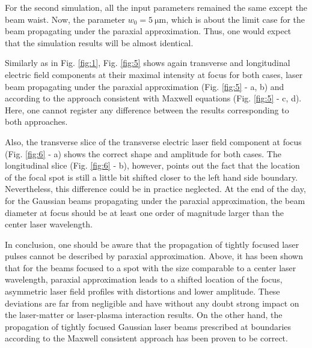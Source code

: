 For the second simulation, all the input parameters remained the same except the beam waist. Now, the parameter $ w_0 = 5 \: \mathrm{\mu m} $, which is about the limit case for the beam propagating under the paraxial approximation. Thus, one would expect that the simulation results will be almost identical.

Similarly as in Fig. \ref{fig:1}, Fig. \ref{fig:5} shows again transverse and longitudinal electric field components at their maximal intensity at focus for both cases, laser beam propagating under the paraxial approximation (Fig. \ref{fig:5} - a, b) and according to the approach consistent with Maxwell equations (Fig. \ref{fig:5} - c, d). Here, one cannot register any difference between the results corresponding to both approaches.

Also, the transverse slice of the transverse electric laser field component at focus (Fig. \ref{fig:6} - a) shows the correct shape and amplitude for both cases. The longitudinal slice (Fig. \ref{fig:6} - b), however, points out the fact that the location of the focal spot is still a little bit shifted closer to the left hand side boundary. Nevertheless, this difference could be in practice neglected. At the end of the day, for the Gaussian beams propagating under the paraxial approximation, the beam diameter at focus should be at least one order of magnitude larger than the center laser wavelength.

In conclusion, one should be aware that the propagation of tightly focused laser pulses cannot be described by paraxial approximation. Above, it has been shown that for the beams focused to a spot with the size comparable to a center laser wavelength, paraxial approximation leads to a shifted location of the focus, asymmetric laser field profiles with distortions and lower amplitude. These deviations are far from negligible and have without any doubt strong impact on the laser-matter or laser-plasma interaction results. On the other hand, the propagation of tightly focused Gaussian laser beams prescribed at boundaries according to the Maxwell consistent approach has been proven to be correct.